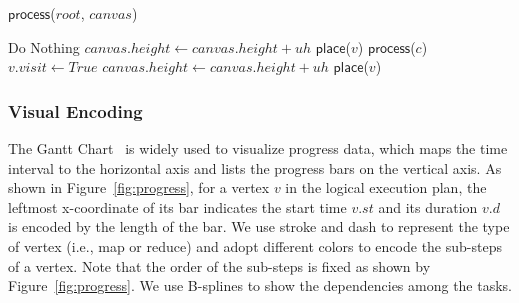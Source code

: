 \begin{algorithm}
	\caption{$\mathsf{TDAGLayout}$ ($R$, $canvas$)}
	\label{alg:TDAGLayout}
	\begin{algorithmic}[1]
		\State$\mathsf{process}$($root$, $canvas$)
		\EndFor
	\end{algorithmic}

\end{algorithm}

\begin{algorithm}
	\caption{$\mathsf{process}$($v$, $canvas$)}
	\label{alg:process}
	\begin{algorithmic}[1]
			\State Do Nothing
		\EndIf
				\State $canvas.height \leftarrow canvas.height + uh$
				\State $\mathsf{place}$($v$)
			\EndIf
		\Else
				\State $\mathsf{process}$($c$)
					\State $v.visit \leftarrow True$
				\EndIf
			\EndFor
				\State $canvas.height \leftarrow canvas.height + uh$
				\State $\mathsf{place}$($v$)
			\EndIf
		\EndIf
	\end{algorithmic}
\end{algorithm}


\subsubsection{Visual Encoding}

The Gantt Chart~\cite{clark1922gantt} is widely used to visualize progress data, which maps the time interval to the horizontal axis and lists the progress bars on the vertical axis.
As shown in Figure~\ref{fig:progress}, for a vertex $v$ in the logical execution plan, the leftmost x-coordinate of its bar indicates the start time $v.st$ and its duration $v.d$ is encoded by the length of the bar. We use stroke and dash to represent the type of vertex (i.e., map or reduce) and adopt different colors to encode the sub-steps of a vertex. Note that the order of the sub-steps is fixed as shown by Figure~\ref{fig:progress}. We use B-splines to show the dependencies among the tasks.

